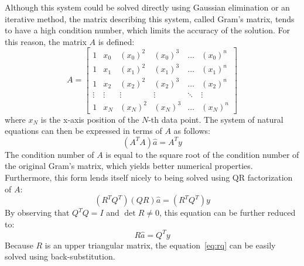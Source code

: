 \documentclass{article}
\begin{document}
	Although this system could be solved directly using Gaussian elimination
	or an iterative method, the matrix describing this system, called Gram's
	matrix, tends to have a high condition number, which limits the accuracy
	of the solution. For this reason, the matrix $A$ is defined:
	\begin{equation}
		A = \begin{bmatrix}
			1 & x_0 & (x_0)^2 & (x_0)^3 & \dots & (x_0)^n \\
			1 & x_1 & (x_1)^2 & (x_1)^3 & \dots & (x_1)^n \\
			1 & x_2 & (x_2)^2 & (x_2)^3 & \dots & (x_2)^n \\
			\vdots & \vdots & \vdots & \vdots & \ddots & \vdots \\
			1 & x_N & (x_N)^2 & (x_N)^3 & \dots & (x_N)^n
		\end{bmatrix}
	\end{equation}
	where $x_N$ is the x-axis position of the $N$-th data point. The system
	of natural equations can then be expressed in terms of $A$ as follows:
	\begin{equation}
		(A^TA)\widehat{a} = A^Ty
	\end{equation}
	The condition number of $A$ is equal to the square root of the condition
	number of the original Gram's matrix, which yields better numerical
	properties. Furthermore, this form lends itself nicely to being solved
	using QR factorization of $A$:
	\begin{equation}
		(R^TQ^T)(QR)\widehat{a} = (R^TQ^T)y
	\end{equation}
	By observing that $Q^TQ = I$ and $\det{R} \neq 0$, this equation can be
	further reduced to:
	\begin{equation}
		R\widehat{a} = Q^Ty
		\label{eq:rq}
	\end{equation}
	Because $R$ is an upper triangular matrix, the equation~\ref{eq:rq} can
	be easily solved using back-substitution.
	
\end{document}
